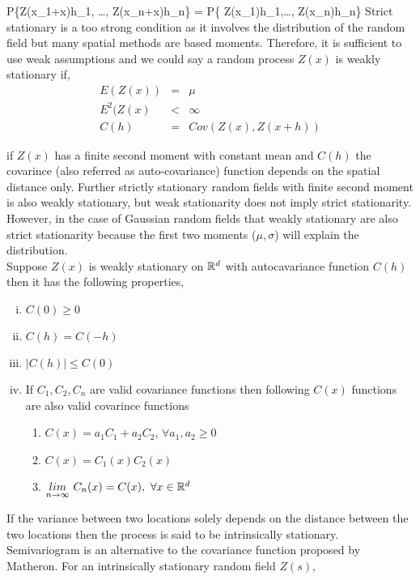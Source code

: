 \beq
P\{Z(x_1+x)\le h_1, \ldots, Z(x_n+x)\le h_n\} = P\{ Z(x_1)\le h_1,\ldots, Z(x_n)\le h_n\}
\eeq
Strict stationary is a too strong condition as it involves the distribution of the random field but many spatial methods are based moments. Therefore, it is sufficient to use weak assumptions and we could say a random process $Z(x)$ is weakly stationary if, 
\begin{eqnarray}
	E(Z(x))   & = & \mu \nonumber \\ 
	E^2(Z(x)  & < & \infty \nonumber \\  
	C(h)      & = & Cov(Z(x),Z(x+h))
\end{eqnarray}

if $Z(x)$ has a finite second moment with constant mean and $C(h)$ the covarince (also referred as auto-covariance) function depends on the spatial distance only. Further strictly stationary random fields with finite second moment is also weakly stationary, but weak stationarity does not imply strict stationarity. However, in the case of Gaussian random fields that weakly stationary are also strict stationarity because the first two moments ($\mu, \sigma$) will explain the distribution. \\

Suppose $Z(x)$ is weakly stationary on $\mathbb{R}^d$ with autocavariance function $C(h)$ then it has the following properties,

\begin{enumerate}[(i)]
	\item $C(0) \ge 0$
	\item $C(h) = C(-h)$
	\item $|C(h)| \le  C(0)$
	\item If $C_1, C_2, C_n$ are valid covariance functions then following $C(x)$ functions are also valid covarince functions
	      
	      \begin{enumerate}
	      	\item $C(x) = a_1C_1+a_2C_2$, $\forall a_1,a_2\ge 0$
	      	\item $C(x) = C_1(x)C_2(x)$
	      	\item $\underset{n\to\infty} {lim}\ C_n(x)=C(x),\ \forall x\in \R^d$ 
	      \end{enumerate}
	      
\end{enumerate}


If the variance between two locations solely depends on the distance between the two locations then the process is said to be intrinsically stationary. Semivariogram is an alternative to the covariance function proposed by Matheron. For an intrinsically stationary random field $Z(s)$,

